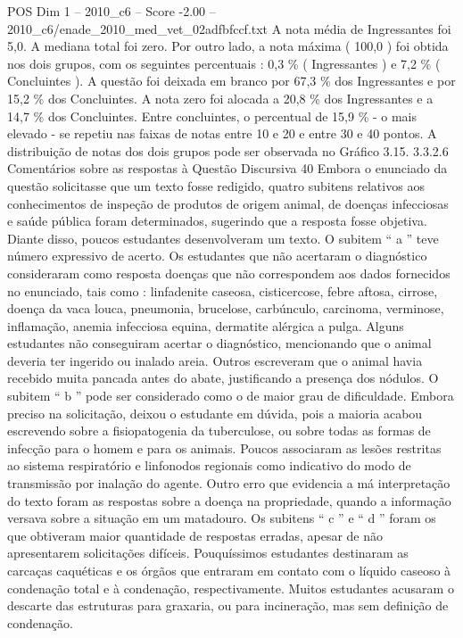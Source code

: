 \begin{textsample}{POS Dim 1 – 2010\_c6 – Score -2.00 – 2010\_c6/enade\_2010\_med\_vet\_02adfbfccf.txt}
A nota média de Ingressantes foi 5,0.
A mediana total foi zero.
Por outro lado, a nota máxima ( 100,0 ) foi obtida nos dois grupos, com os seguintes percentuais : 0,3 \% ( Ingressantes ) e 7,2 \% ( Concluintes ).
A questão foi deixada em branco por 67,3 \% dos Ingressantes e por 15,2 \% dos Concluintes.
A nota zero foi alocada a 20,8 \% dos Ingressantes e a 14,7 \% dos Concluintes.
Entre concluintes, o percentual de 15,9 \% - o mais elevado - se repetiu nas faixas de notas entre 10 e 20 e entre 30 e 40 pontos.
A distribuição de notas dos dois grupos pode ser observada no Gráfico 3.15. 3.3.2.6 Comentários sobre as respostas à Questão Discursiva 40 Embora o enunciado da questão solicitasse que um texto fosse redigido, quatro subitens relativos aos conhecimentos de inspeção de produtos de origem animal, de doenças infecciosas e saúde pública foram determinados, sugerindo que a resposta fosse objetiva.
Diante disso, poucos estudantes desenvolveram um texto.
O subitem “ a ” teve número expressivo de acerto.
Os estudantes que não acertaram o diagnóstico consideraram como resposta doenças que não correspondem aos dados fornecidos no enunciado, tais como : linfadenite caseosa, cisticercose, febre aftosa, cirrose, doença da vaca louca, pneumonia, brucelose, carbúnculo, carcinoma, verminose, inflamação, anemia infecciosa equina, dermatite alérgica a pulga.
Alguns estudantes não conseguiram acertar o diagnóstico, mencionando que o animal deveria ter ingerido ou inalado areia.
Outros escreveram que o animal havia recebido muita pancada antes do abate, justificando a presença dos nódulos.
O subitem “ b ” pode ser considerado como o de maior grau de dificuldade.
Embora preciso na solicitação, deixou o estudante em dúvida, pois a maioria acabou escrevendo sobre a fisiopatogenia da tuberculose, ou sobre todas as formas de infecção para o homem e para os animais.
Poucos associaram as lesões restritas ao sistema respiratório e linfonodos regionais como indicativo do modo de transmissão por inalação do agente.
Outro erro que evidencia a má interpretação do texto foram as respostas sobre a doença na propriedade, quando a informação versava sobre a situação em um matadouro.
Os subitens “ c ” e “ d ” foram os que obtiveram maior quantidade de respostas erradas, apesar de não apresentarem solicitações difíceis.
Pouquíssimos estudantes destinaram as carcaças caquéticas e os órgãos que entraram em contato com o líquido caseoso à condenação total e à condenação, respectivamente.
Muitos estudantes acusaram o descarte das estruturas para graxaria, ou para incineração, mas sem definição de condenação.

\end{textsample}
